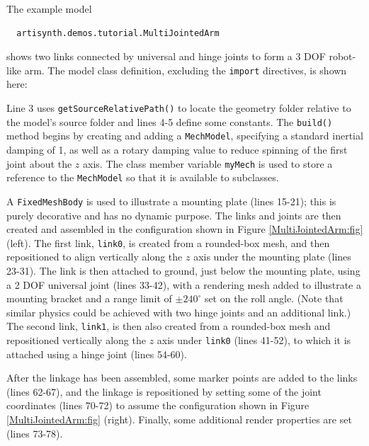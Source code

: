 The example model
%
\begin{verbatim}
  artisynth.demos.tutorial.MultiJointedArm
\end{verbatim}
%
shows two links connected by universal and hinge joints to form a 3 DOF
robot-like arm. The model class definition, excluding the {\tt import} directives,
is shown here:
%
\lstset{numbers=left}
\iflatexml

\else

\fi
\lstset{numbers=none}
%
Line 3 uses {\tt getSourceRelativePath()} to locate the geometry folder
relative to the model's source folder and lines 4-5 define some constants.  The
{\tt build()} method begins by creating and adding a {\tt MechModel},
specifying a standard inertial damping of 1, as well as a rotary damping value
to reduce spinning of the first joint about the $z$ axis. The class member
variable {\tt myMech} is used to store a reference to the {\tt MechModel} so
that it is available to subclasses.

A {\tt FixedMeshBody} is used to illustrate a mounting plate (lines 15-21);
this is purely decorative and has no dynamic purpose. The links and joints are
then created and assembled in the configuration shown in
Figure \ref{MultiJointedArm:fig} (left). The first link, {\tt link0}, is
created from a rounded-box mesh, and then repositioned to align vertically
along the $z$ axis under the mounting plate (lines 23-31).  The link is then
attached to ground, just below the mounting plate, using a 2 DOF universal
joint (lines 33-42), with a rendering mesh added to illustrate a mounting
bracket and a range limit of $\pm 240^\circ$ set on the roll angle. (Note that
similar physics could be achieved with two hinge joints and an additional
link.) The second link, {\tt link1}, is then also created from a rounded-box
mesh and repositioned vertically along the $z$ axis under {\tt link0} (lines
41-52), to which it is attached using a hinge joint (lines 54-60).

After the linkage has been assembled, some marker points are added to the
links (lines 62-67), and the linkage is repositioned by setting some of the
joint coordinates (lines 70-72) to assume the configuration shown in
Figure \ref{MultiJointedArm:fig} (right). Finally, some
additional render properties are set (lines 73-78).

